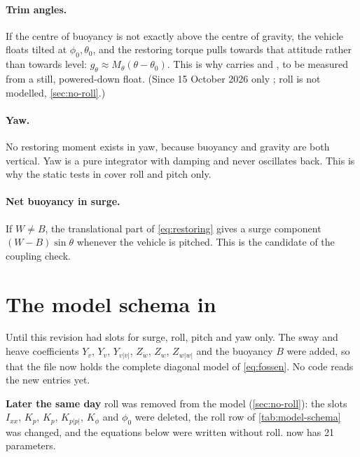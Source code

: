 \paragraph{Trim angles.} If the centre of buoyancy is not exactly above the centre of
gravity, the vehicle floats tilted at $\phi_0, \theta_0$, and the restoring torque pulls
towards that attitude rather than towards level: $g_\theta \approx M_\theta(\theta-\theta_0)$.
This is why  carries  and , to be measured from
a still, powered-down float. (Since 15 October 2026 only ; roll is not
modelled, \cref{sec:no-roll}.)

\paragraph{Yaw.} No restoring moment exists in yaw, because buoyancy and gravity are both
vertical. Yaw is a pure integrator with damping and never oscillates back. This is why the
static tests in  cover roll and pitch only.

\paragraph{Net buoyancy in surge.} If $W \ne B$, the translational part of
\eqref{eq:restoring} gives a surge component $(W - B)\sin\theta$ whenever the vehicle is
pitched. This is the  candidate of the coupling check.

\section{The model schema in }
\label{sec:model-schema}

\begin{revised}[title={New section, added 15 October 2026}]
Until this revision  had slots for surge, roll, pitch and yaw only. The sway
and heave coefficients $Y_{\dot v}$, $Y_v$, $Y_{v|v|}$, $Z_{\dot w}$, $Z_w$, $Z_{w|w|}$ and the
buoyancy $B$ were added, so that the file now holds the complete diagonal model of
\eqref{eq:fossen}. No code reads the new entries yet.

\textbf{Later the same day} roll was removed from the model (\cref{sec:no-roll}): the slots
$I_{xx}$, $K_{\dot p}$, $K_p$, $K_{p|p|}$, $K_\phi$ and $\phi_0$ were deleted, the roll row of
\cref{tab:model-schema} was changed, and the equations below were written without roll.
 now has 21 parameters.
\end{revised}

